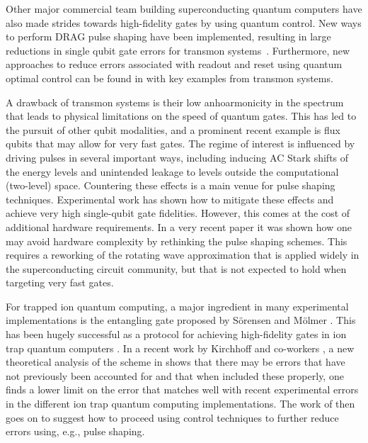 Other major commercial team building superconducting quantum computers have also made strides towards high-fidelity gates by using quantum control. New ways to perform DRAG pulse shaping have been implemented, resulting in large reductions in single qubit gate errors for transmon systems~\cite{hyyppa2024reducing}. Furthermore, new approaches to reduce errors associated with readout and reset using quantum optimal control can be found in \cite{gautier2025optimal} with key examples from transmon systems. 

A drawback of transmon systems is their low anhoarmonicity in the spectrum that leads to physical limitations on the speed of quantum gates. This has led to the pursuit of other qubit modalities, and a prominent recent example is flux qubits that may allow for very fast gates. The regime of interest is influenced by driving pulses in several important ways, including inducing AC Stark shifts of the energy levels and unintended leakage to levels outside the computational (two-level) space. Countering these effects is a main venue for pulse shaping techniques. Experimental work \cite{rower2024suppressing} has shown how to mitigate these effects and achieve very high single-qubit gate fidelities. However, this comes at the cost of additional hardware requirements. In a very recent paper \cite{zwanenburg2025single} it was shown how one may avoid hardware complexity by rethinking the pulse shaping schemes. This requires a reworking of the rotating wave approximation that is applied widely in the superconducting circuit community, but that is not expected to hold when targeting very fast gates. 

For trapped ion quantum computing, a major ingredient in many experimental implementations is the entangling gate proposed by S{\"o}rensen and M{\"o}lmer \cite{sorensen2000entanglement}. This has been hugely successful as a protocol for achieving high-fidelity gates in ion trap quantum computers \cite{schafer2018fast,gerster2022experimental,moses2023race}. In a recent work by Kirchhoff and co-workers \cite{kirchhoff2025correction}, a new theoretical analysis of the scheme in \cite{sorensen2000entanglement} shows that there may be errors that have not previously been accounted for and that when included these properly, one finds a lower limit on the error that matches well with recent experimental errors in the different ion trap quantum computing implementations. The work of \cite{kirchhoff2025correction} then goes on to suggest how to proceed using control techniques to further reduce errors using, e.g., pulse shaping. 

